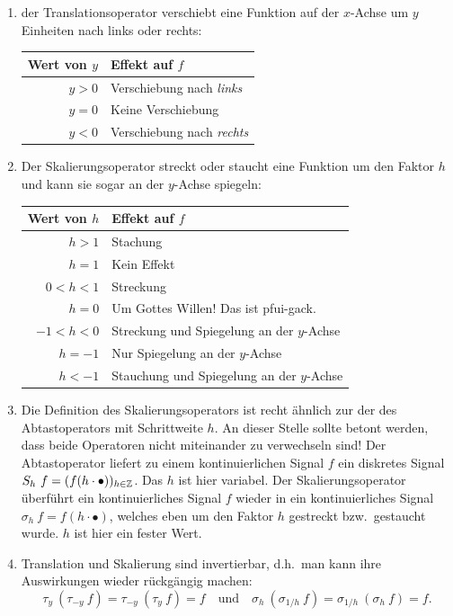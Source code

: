 \begin{remark} \leavevmode
\begin{enumerate}
\item der Translationsoperator verschiebt eine Funktion auf der $ x $-Achse um $ y $ Einheiten nach 
links oder rechts:
\par
\begin{center}
  \begin{tabular}{rl} \toprule
  Wert von $ y $ & Effekt auf $ f $ \\ \midrule
  $ y > 0 $ & Verschiebung nach \emph{links} \\
  $ y = 0 $ & Keine Verschiebung \\
  $ y < 0 $ & Verschiebung nach \emph{rechts} \\ \bottomrule
  \end{tabular}
\end{center}
\item Der Skalierungsoperator streckt oder staucht eine Funktion um den Faktor $ h $ und kann sie 
sogar an der $ y $-Achse spiegeln:\par
\begin{center}
  \begin{tabular}{rl} \toprule
  Wert von $ h $ & Effekt auf $ f $ \\ \midrule
  $ h > 1 $ & Stachung \\
  $ h = 1 $ & Kein Effekt \\
  $ 0 < h < 1 $ & Streckung \\ \midrule
  $ h = 0 $ & Um Gottes Willen! Das ist pfui-gack. \\ \midrule
  $ -1 < h < 0 $ & Streckung und Spiegelung an der $ y $-Achse \\
  $ h = -1 $ & Nur Spiegelung an der $ y $-Achse \\
  $ h < -1 $ & Stauchung und Spiegelung an der $ y $-Achse \\ \bottomrule
  \end{tabular}
\end{center}
\item Die Definition des Skalierungsoperators ist recht ähnlich zur der des Abtastoperators mit
  Schrittweite $ h $. An dieser Stelle sollte betont werden, dass beide Operatoren nicht miteinander
  zu verwechseln sind! Der Abtastoperator liefert zu einem kontinuierlichen Signal $ f $
  ein diskretes Signal $ S_{h} \ f = (f(h \cdot \bullet))_{h \in \mathbb{Z}} $. Das $ h $ ist hier 
  variabel. Der Skalierungsoperator überführt ein kontinuierliches Signal $ f $ wieder in ein 
  kontinuierliches Signal $ \sigma_{h} \ f = f(h \cdot \bullet) $, welches eben um den Faktor $ h $ 
  gestreckt bzw.\ gestaucht wurde. $ h $ ist hier ein fester Wert.
\item Translation und Skalierung sind invertierbar, d.h.\ man kann ihre Auswirkungen wieder
rückgängig machen:
\[
  \tau_{y} \ (\tau_{-y} \ f) = \tau_{-y} \ (\tau_{y} \ f) = f \quad \text{und} \quad
  \sigma_{h} \ (\sigma_{1/h} \ f) = \sigma_{1/h} \ (\sigma_{h} \ f) = f.
\]
\end{enumerate}
\end{remark}

